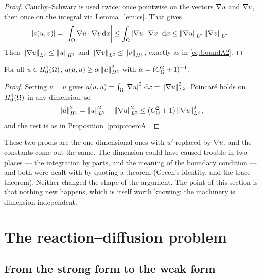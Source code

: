 \documentclass[11pt,a4paper]{article}
\begin{document}
\begin{proof}
Cauchy--Schwarz is used twice: once pointwise on the vectors $\nabla u$ and
$\nabla v$, then once on the integral via Lemma~\ref{lem:cs}. That gives
\[
  \left\lvert a(u,v) \right\rvert = \left\lvert \int_\Omega \nabla u \cdot \nabla v \,\mathrm{d}x \right\rvert
  \le \int_\Omega \left\lvert \nabla u \right\rvert\left\lvert \nabla v \right\rvert \,\mathrm{d}x
  \le \left\lVert \nabla u \right\rVert_{L^{2}}\left\lVert \nabla v \right\rVert_{L^{2}} .
\]
Then $\left\lVert \nabla u \right\rVert_{L^{2}} \le \left\lVert u \right\rVert_{H^{1}}$ and $\left\lVert \nabla v \right\rVert_{L^{2}} \le \left\lVert v \right\rVert_{H^{1}}$, exactly
as in \eqref{eq:boundA2}.
\end{proof}

\begin{proposition}\label{prop:coercB}
For all $u \in H^{1}_{0}(\Omega)$, $a(u,u) \ge \alpha\left\lVert u \right\rVert_{H^{1}}^{2}$ with
$\alpha = (C_\Omega^{2}+1)^{-1}$.
\end{proposition}

\begin{proof}
Setting $v=u$ gives
$a(u,u) = \int_\Omega \left\lvert \nabla u \right\rvert^{2}\,\mathrm{d}x = \left\lVert \nabla u \right\rVert_{L^{2}}^{2}$. Poincar\'e holds
on $H^{1}_{0}(\Omega)$ in any dimension, so
\[
  \left\lVert u \right\rVert_{H^{1}}^{2} = \left\lVert u \right\rVert_{L^{2}}^{2} + \left\lVert \nabla u \right\rVert_{L^{2}}^{2}
  \le \left( C_\Omega^{2}+1 \right)\left\lVert \nabla u \right\rVert_{L^{2}}^{2},
\]
and the rest is as in Proposition~\ref{prop:coercA}.
\end{proof}

\begin{remark}
These two proofs are the one-dimensional ones with $u'$ replaced by $\nabla u$,
and the constants come out the same. The dimension could have caused trouble in
two places --- the integration by parts, and the meaning of the boundary
condition --- and both were dealt with by quoting a theorem (Green's identity,
and the trace theorem). Neither changed the shape of the argument. The point of
this section is that nothing new happens, which is itself worth knowing: the
machinery is dimension-independent.
\end{remark}

\section{The reaction--diffusion problem}
\label{sec:reaction}

\subsection{From the strong form to the weak form}
\end{document}
